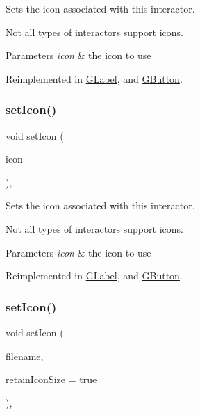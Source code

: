 Sets the icon associated with this interactor. 

Not all types of interactors support icons. 
\begin{DoxyParams}{Parameters}
{\em icon} & the icon to use \\
\hline
\end{DoxyParams}


Reimplemented in \mbox{\hyperlink{classGLabel_acca97b6c6330abded1c80521c9aca3a6}{G\+Label}}, and \mbox{\hyperlink{classGButton_acca97b6c6330abded1c80521c9aca3a6}{G\+Button}}.

\mbox{\label{classGInteractor_a368e1a338f84401c284506d03b1ba769}} 
\subsubsection{\texorpdfstring{set\+Icon()}{setIcon()}\hspace{0.1cm}{\footnotesize\ttfamily [2/3]}}
{\footnotesize\ttfamily void set\+Icon (\begin{DoxyParamCaption}\item[{const Q\+Pixmap \&}]{icon }\end{DoxyParamCaption})\hspace{0.3cm}{\ttfamily [virtual]}, {\ttfamily [inherited]}}



Sets the icon associated with this interactor. 

Not all types of interactors support icons. 
\begin{DoxyParams}{Parameters}
{\em icon} & the icon to use \\
\hline
\end{DoxyParams}


Reimplemented in \mbox{\hyperlink{classGLabel_acb5275b880ff622d306f8f33428b4e34}{G\+Label}}, and \mbox{\hyperlink{classGButton_acb5275b880ff622d306f8f33428b4e34}{G\+Button}}.

\mbox{\label{classGInteractor_a762e139aa311461c3984d3ad28293f64}} 
\subsubsection{\texorpdfstring{set\+Icon()}{setIcon()}\hspace{0.1cm}{\footnotesize\ttfamily [3/3]}}
{\footnotesize\ttfamily void set\+Icon (\begin{DoxyParamCaption}\item[{const std\+::string \&}]{filename,  }\item[{bool}]{retain\+Icon\+Size = {\ttfamily true} }\end{DoxyParamCaption})\hspace{0.3cm}{\ttfamily [virtual]}, {\ttfamily [inherited]}}



